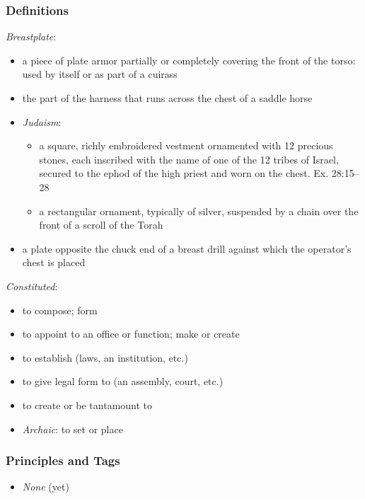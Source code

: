 \documentclass[12pt]{report}
\begin{document}
\subsubsection{Definitions\label{js:DFN8}}
\emph{Breastplate}: \begin{itemize}
\item a piece of plate armor partially or completely covering the front of the torso: used by itself or as part of a cuirass
\item the part of the harness that runs across the chest of a saddle horse
\item \emph{Judaism}:\begin{itemize}
	\item a square, richly embroidered vestment ornamented with 12 precious stones, each inscribed with the name of one of the 12 tribes of Israel, secured to the ephod of the high priest and worn on the chest. Ex. 28:15–28
	\item a rectangular ornament, typically of silver, suspended by a chain over the front of a scroll of the Torah
	\end{itemize}
\item a plate opposite the chuck end of a breast drill against which the operator's chest is placed
\end{itemize}
\emph{Constituted}: \begin{itemize}
\item to compose; form
\item to appoint to an office or function; make or create
\item to establish (laws, an institution, etc.)
\item to give legal form to (an assembly, court, etc.)
\item to create or be tantamount to
\item \emph{Archaic}: to set or place
\end{itemize}

\subsubsection{Principles and Tags\label{js:principles8}}
\begin{itemize}
\item \index{}\emph{None} (yet)
\end{itemize}
\end{document}
